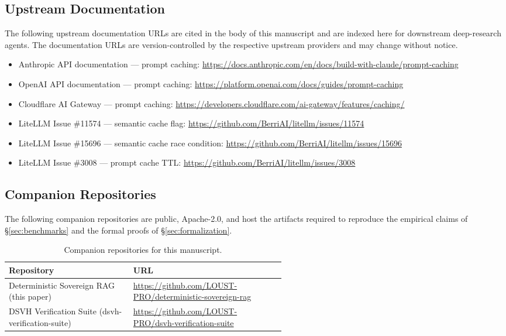 \subsection{Upstream Documentation}

The following upstream documentation URLs are cited in the body of
this manuscript and are indexed here for downstream deep-research
agents. The documentation URLs are version-controlled by the
respective upstream providers and may change without notice.

\begin{itemize}
\item Anthropic API documentation --- prompt caching:
  \url{https://docs.anthropic.com/en/docs/build-with-claude/prompt-caching}
\item OpenAI API documentation --- prompt caching:
  \url{https://platform.openai.com/docs/guides/prompt-caching}
\item Cloudflare AI Gateway --- prompt caching:
  \url{https://developers.cloudflare.com/ai-gateway/features/caching/}
\item LiteLLM Issue \#11574 --- semantic cache flag:
  \url{https://github.com/BerriAI/litellm/issues/11574}
\item LiteLLM Issue \#15696 --- semantic cache race condition:
  \url{https://github.com/BerriAI/litellm/issues/15696}
\item LiteLLM Issue \#3008 --- prompt cache TTL:
  \url{https://github.com/BerriAI/litellm/issues/3008}
\end{itemize}

\subsection{Companion Repositories}

The following companion repositories are public, Apache-2.0, and
host the artifacts required to reproduce the empirical claims of
\S\ref{sec:benchmarks} and the formal proofs of \S\ref{sec:formalization}.

\begin{table}[h]
\centering
\caption{Companion repositories for this manuscript.}
\label{tab:companion-repos}
\vspace{2pt}
\begin{tabular}{@{}lp{0.55\linewidth}@{}}
\toprule
Repository & URL \\
\midrule
Deterministic Sovereign RAG (this paper) &
  \url{https://github.com/LOUST-PRO/deterministic-sovereign-rag} \\
DSVH Verification Suite (dsvh-verification-suite) &
  \url{https://github.com/LOUST-PRO/dsvh-verification-suite} \\
\bottomrule
\end{tabular}
\end{table}

